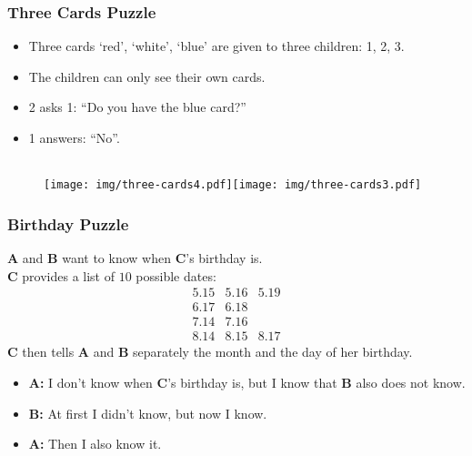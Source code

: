 \documentclass[UTF8,aspectratio=43,11pt,colorlinks,compress,openany]{beamer}%
\begin{document}
\begin{frame}\frametitle{Three Cards Puzzle}
\begin{itemize}
	\item Three cards `red', `white', `blue' are given to three children: 1, 2, 3.
	\item The children can only see their own cards.
	\item 2 asks 1: ``Do you have the blue card?''
	\item 1 answers: ``No''.
\end{itemize}
\begin{figure}[H]
\\
\texttt{[image: img/three-cards4.pdf]}\hspace*{25pt}\texttt{[image: img/three-cards3.pdf]}
\end{figure}
\end{frame}

\begin{frame}\frametitle{Birthday Puzzle}
	\textbf{A} and \textbf{B} want to know when \textbf{C}'s birthday is.\\
	\textbf{C} provides a list of $10$ possible dates:
\[
\begin{array}{ccc}
5.15 &5.16 &5.19\\
6.17 &6.18\\
7.14 &7.16\\
8.14 &8.15 &8.17
\end{array}
\]
	\textbf{C} then tells \textbf{A} and \textbf{B} separately the month and the day of her birthday.
	\begin{itemize}
		\item \textbf{A:} I don't know when \textbf{C}'s birthday is, but I know that \textbf{B} also does not know.
		\item \textbf{B:} At first I didn't know, but now I know.
		\item \textbf{A:} Then I also know it.
	\end{itemize}
\end{frame}
\end{document}
